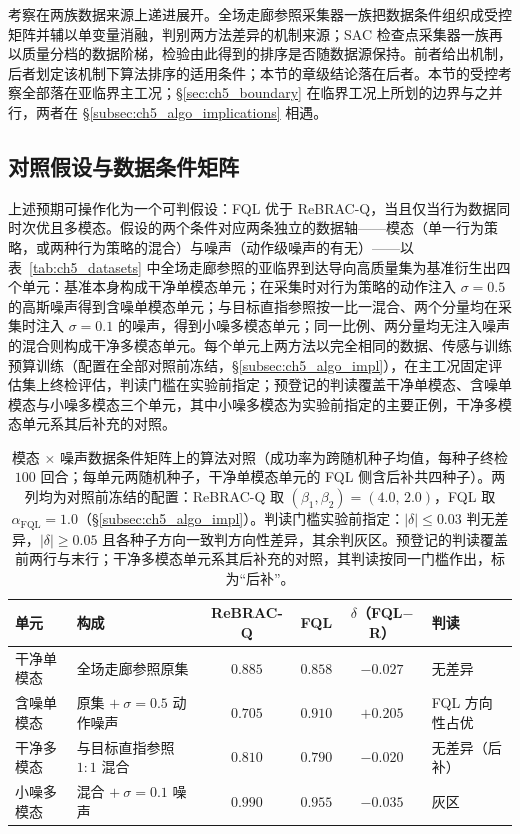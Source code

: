 考察在两族数据来源上递进展开。全场走廊参照采集器一族把数据条件组织成受控矩阵并辅以单变量消融，判别两方法差异的机制来源；SAC 检查点采集器一族再以质量分档的数据阶梯，检验由此得到的排序是否随数据源保持。前者给出机制，后者划定该机制下算法排序的适用条件；本节的章级结论落在后者。本节的受控考察全部落在亚临界主工况；\S\ref{sec:ch5_boundary} 在临界工况上所划的边界与之并行，两者在 \S\ref{subsec:ch5_algo_implications} 相遇。

\subsection{对照假设与数据条件矩阵}\label{subsec:ch5_algo_matrix}

上述预期可操作化为一个可判假设：FQL 优于 ReBRAC-Q，当且仅当行为数据同时次优且多模态。假设的两个条件对应两条独立的数据轴——模态（单一行为策略，或两种行为策略的混合）与噪声（动作级噪声的有无）——以表~\ref{tab:ch5_datasets} 中全场走廊参照的亚临界到达导向高质量集为基准衍生出四个单元：基准本身构成干净单模态单元；在采集时对行为策略的动作注入 $\sigma=0.5$ 的高斯噪声得到含噪单模态单元；与目标直指参照按一比一混合、两个分量均在采集时注入 $\sigma=0.1$ 的噪声，得到小噪多模态单元；同一比例、两分量均无注入噪声的混合则构成干净多模态单元。每个单元上两方法以完全相同的数据、传感与训练预算训练（配置在全部对照前冻结，\S\ref{subsec:ch5_algo_impl}），在主工况固定评估集上终检评估，判读门槛在实验前指定；预登记的判读覆盖干净单模态、含噪单模态与小噪多模态三个单元，其中小噪多模态为实验前指定的主要正例，干净多模态单元系其后补充的对照。

\begin{table}[t]
\centering
\caption{模态 $\times$ 噪声数据条件矩阵上的算法对照（成功率为跨随机种子均值，每种子终检 $100$ 回合；每单元两随机种子，干净单模态单元的 FQL 侧含后补共四种子）。两列均为对照前冻结的配置：ReBRAC-Q 取 $(\beta_1,\beta_2)=(4.0,\,2.0)$，FQL 取 $\alpha_{\mathrm{FQL}}=1.0$（\S\ref{subsec:ch5_algo_impl}）。判读门槛实验前指定：$|\delta|\le 0.03$ 判无差异，$|\delta|\ge 0.05$ 且各种子方向一致判方向性差异，其余判灰区。预登记的判读覆盖前两行与末行；干净多模态单元系其后补充的对照，其判读按同一门槛作出，标为“后补”。}
\label{tab:ch5_fql_matrix}
\small
\setlength{\tabcolsep}{5pt}
\begin{tabular}{l l c c c l}
\toprule
\textbf{单元} & \textbf{构成} & \textbf{ReBRAC-Q} & \textbf{FQL} & \textbf{$\delta$（FQL$-$R）} & \textbf{判读} \\
\midrule
干净单模态 & 全场走廊参照原集 & $0.885$ & $0.858$ & $-0.027$ & 无差异 \\
含噪单模态 & 原集 $+\ \sigma{=}0.5$ 动作噪声 & $0.705$ & $0.910$ & $+0.205$ & FQL 方向性占优 \\
干净多模态 & 与目标直指参照 $1{:}1$ 混合 & $0.810$ & $0.790$ & $-0.020$ & 无差异（后补） \\
小噪多模态 & 混合 $+\ \sigma{=}0.1$ 噪声 & $0.990$ & $0.955$ & $-0.035$ & 灰区 \\
\bottomrule
\end{tabular}
\end{table}

